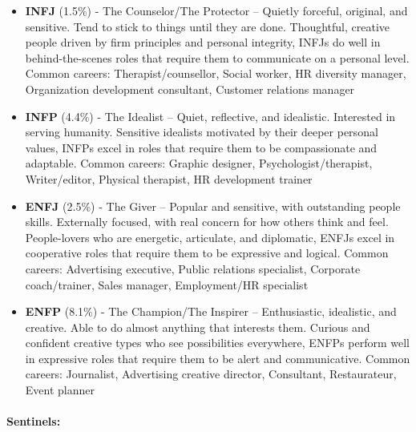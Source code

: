 \documentclass[]{book}
\let\oldparagraph\paragraph
\renewcommand{\paragraph}[1]{\oldparagraph{#1}\mbox{}}
\begin{document}
\begin{itemize}
\item
  \textbf{INFJ} (1.5\%) - The Counselor/The Protector -- Quietly forceful, original, and sensitive. Tend to stick to things until they are done. Thoughtful, creative people driven by firm principles and personal integrity, INFJs do well in behind-the-scenes roles that require them to communicate on a personal level. Common careers: Therapist/counsellor, Social worker, HR diversity manager, Organization development consultant, Customer relations manager
\item
  \textbf{INFP} (4.4\%) - The Idealist -- Quiet, reflective, and idealistic. Interested in serving humanity. Sensitive idealists motivated by their deeper personal values, INFPs excel in roles that require them to be compassionate and adaptable. Common careers: Graphic designer, Psychologist/therapist, Writer/editor, Physical therapist, HR development trainer
\item
  \textbf{ENFJ} (2.5\%) - The Giver -- Popular and sensitive, with outstanding people skills. Externally focused, with real concern for how others think and feel. People-lovers who are energetic, articulate, and diplomatic, ENFJs excel in cooperative roles that require them to be expressive and logical. Common careers: Advertising executive, Public relations specialist, Corporate coach/trainer, Sales manager, Employment/HR specialist
\item
  \textbf{ENFP} (8.1\%) - The Champion/The Inspirer -- Enthusiastic, idealistic, and creative. Able to do almost anything that interests them. Curious and confident creative types who see possibilities everywhere, ENFPs perform well in expressive roles that require them to be alert and communicative. Common careers: Journalist, Advertising creative director, Consultant, Restaurateur, Event planner
\end{itemize}

\hypertarget{sentinels}{%
\paragraph{Sentinels:}\label{sentinels}}
\end{document}
